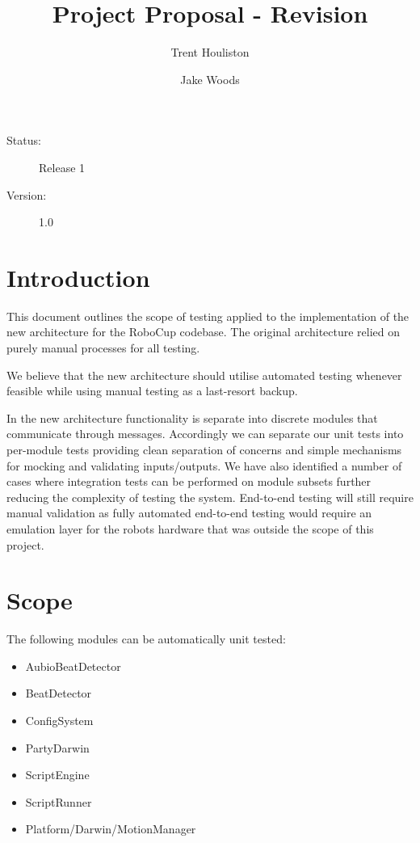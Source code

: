 \documentclass[english,12pt]{scrartcl}
\title{Project Proposal - Revision}
\author{Trent Houliston \and Jake Woods}
\begin{document}
	\maketitle
	\vfill
	{\large
		\begin{description}
			\item [Status:] Release 1
			\item [Version:] 1.0
		\end{description}}

	\clearpage
	\tableofcontents
	\clearpage

\section{Introduction}
	This document outlines the scope of testing applied to the implementation of the new architecture for the RoboCup codebase. 
	The original architecture relied on purely manual processes for all testing.
	 
	We believe that the new architecture should utilise automated testing whenever feasible while using manual testing as a last-resort backup.
	
	In the new architecture functionality is separate into discrete modules that communicate through messages. 
	Accordingly we can separate our unit tests into per-module tests providing clean separation of concerns and simple mechanisms for mocking and validating inputs/outputs.
	We have also identified a number of cases where integration tests can be performed on module subsets further reducing the complexity of testing the system.
	End-to-end testing will still require manual validation as fully automated end-to-end testing would require an emulation layer for the robots hardware that was outside the scope of this project.

\section{Scope}
	The following modules can be automatically unit tested:
	\begin{itemize}
		\item AubioBeatDetector
		\item BeatDetector
		\item ConfigSystem
		\item PartyDarwin
		\item ScriptEngine
		\item ScriptRunner
		\item Platform/Darwin/MotionManager
	\end{itemize}
\end{document}
